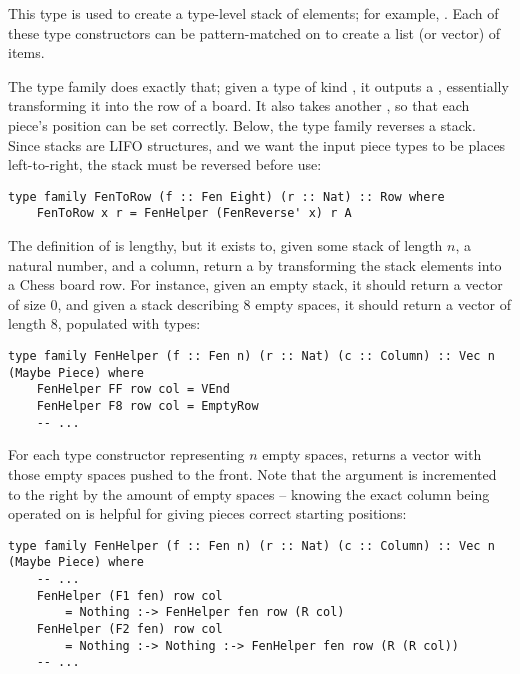 This  type is used to create a type-level stack of elements; for example, . Each of these  type constructors can be pattern-matched on to create a list (or vector) of items.

The type family  does exactly that; given a type of kind , it outputs a , essentially transforming it into the row of a board. It also takes another , so that each piece's position can be set correctly. Below, the type family  reverses a  stack. Since stacks are LIFO structures, and we want the input piece types to be places left-to-right, the stack must be reversed before use:

\begin{lstlisting}
type family FenToRow (f :: Fen Eight) (r :: Nat) :: Row where
    FenToRow x r = FenHelper (FenReverse' x) r A
\end{lstlisting}

The definition of  is lengthy, but it exists to, given some  stack of length $n$, a natural number, and a column, return a  by transforming the stack elements into a Chess board row. For instance, given an empty stack, it should return a vector of size 0, and given a stack describing 8 empty spaces, it should return a vector of length 8, populated with  types:

\begin{lstlisting}
type family FenHelper (f :: Fen n) (r :: Nat) (c :: Column) :: Vec n (Maybe Piece) where
    FenHelper FF row col = VEnd
    FenHelper F8 row col = EmptyRow
    -- ...
\end{lstlisting}

For each type constructor representing $n$ empty spaces,  returns a vector with those empty spaces pushed to the front. Note that the  argument is incremented to the right by the amount of empty spaces -- knowing the exact column being operated on is helpful for giving pieces correct starting positions:

\begin{lstlisting}
type family FenHelper (f :: Fen n) (r :: Nat) (c :: Column) :: Vec n (Maybe Piece) where
    -- ...
    FenHelper (F1 fen) row col
        = Nothing :-> FenHelper fen row (R col)
    FenHelper (F2 fen) row col
        = Nothing :-> Nothing :-> FenHelper fen row (R (R col))
    -- ...
\end{lstlisting}

